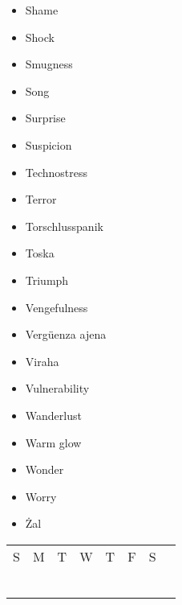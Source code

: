 \documentclass[a5paper]{article}
\begin{document}
\begin{itemize}
	\item Shame
	\item Shock
	\item Smugness
	\item Song
	\item Surprise
	\item Suspicion
	\item Technostress
	\item Terror
	\item Torschlusspanik
	\item Toska
	\item Triumph
	\item Vengefulness
	\item Vergüenza ajena
	\item Viraha
	\item Vulnerability
	\item Wanderlust
 	\item Warm glow
	\item Wonder
	\item Worry
	\item Żal
\end{itemize}
\begin{table}[htp]
\begin{tabular}{|l|l|l|l|l|l|l|l}
\cline{1-7}
S & M & T & W & T & F & S & \multirow{7}{*}{} \\ \cline{1-7}
  &   &   &   &   &   &   &                   \\ \cline{1-7}
  &   &   &   &   &   &   &                   \\ \cline{1-7}
  &   &   &   &   &   &   &                   \\ \cline{1-7}
  &   &   &   &   &   &   &                   \\ \cline{1-7}
  &   &   &   &   &   &   &                   \\ \cline{1-7}
  &   &   &   &   &   &   &                   \\ \cline{1-7}
\end{tabular}
\end{table}
\end{document}

